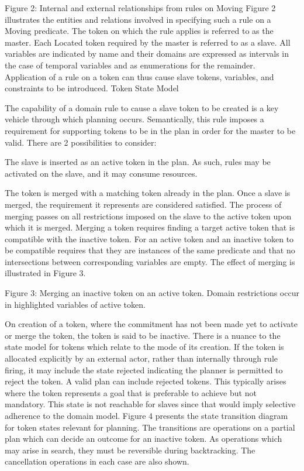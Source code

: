 Figure 2: Internal and external relationships from rules on Moving
Figure 2 illustrates the entities and relations involved in specifying
such a rule on a Moving predicate. The token on which the rule applies
is referred to as the master. Each Located token required by the
master is referred to as a slave. All variables are indicated by name
and their domains are expressed as intervals in the case of temporal
variables and as enumerations for the remainder. Application of a rule
on a token can thus cause slave tokens, variables, and constraints to
be introduced.  Token State Model

The capability of a domain rule to cause a slave token to be created
is a key vehicle through which planning occurs. Semantically, this
rule imposes a requirement for supporting tokens to be in the plan in
order for the master to be valid. There are 2 possibilities to
consider:

The slave is inserted as an active token in the plan. As such, rules
may be activated on the slave, and it may consume resources.

The token is merged with a matching token already in the plan. Once a
slave is merged, the requirement it represents are considered
satisfied. The process of merging passes on all restrictions imposed
on the slave to the active token upon which it is merged. Merging a
token requires finding a target active token that is compatible with
the inactive token. For an active token and an inactive token to be
compatible requires that they are instances of the same predicate and
that no intersections between corresponding variables are empty. The
effect of merging is illustrated in Figure 3.

    Figure 3: Merging an inactive token on an active token. Domain
    restrictions occur in highlighted variables of active token.

    On creation of a token, where the commitment has not been made yet
    to activate or merge the token, the token is said to be
    inactive. There is a nuance to the state model for tokens which
    relate to the mode of its creation. If the token is allocated
    explicitly by an external actor, rather than internally through
    rule firing, it may include the state rejected indicating the
    planner is permitted to reject the token. A valid plan can include
    rejected tokens. This typically arises where the token represents
    a goal that is preferable to achieve but not mandatory. This state
    is not reachable for slaves since that would imply selective
    adherence to the domain model. Figure 4 presents the state
    transition diagram for token states relevant for planning. The
    transitions are operations on a partial plan which can decide an
    outcome for an inactive token. As operations which may arise in
    search, they must be reversible during backtracking. The
    cancellation operations in each case are also shown.

